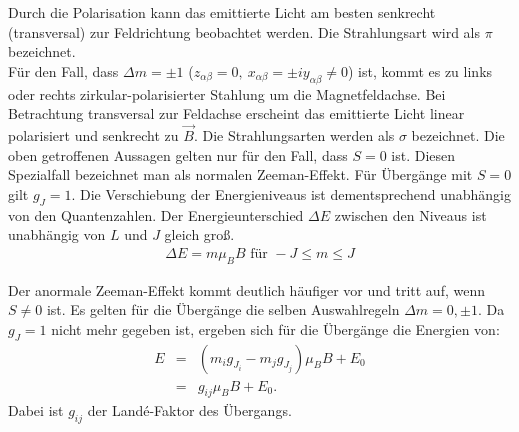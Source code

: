Durch die Polarisation kann das emittierte Licht am besten senkrecht (transversal) zur Feldrichtung beobachtet werden.
Die Strahlungsart wird als $\pi$ bezeichnet.\\
%
Für den Fall, dass $\Delta m = \pm 1$ ($z_{\alpha\beta} = 0,\ x_{\alpha\beta} = \pm i y_{\alpha\beta} \neq 0$) ist, kommt es zu links oder rechts zirkular-polarisierter Stahlung um die Magnetfeldachse.
Bei Betrachtung transversal zur Feldachse erscheint das emittierte Licht linear polarisiert und senkrecht zu $\vec{B}$.
Die Strahlungsarten werden als $\sigma$ bezeichnet.
%
Die oben getroffenen Aussagen gelten nur für den Fall, dass $S=0$ ist.
Diesen Spezialfall bezeichnet man als normalen Zeeman-Effekt.
Für Übergänge mit $S=0$ gilt $g_J = 1$.
Die Verschiebung der Energieniveaus ist dementsprechend unabhängig von den Quantenzahlen.
Der Energieunterschied $\Delta E$ zwischen den Niveaus ist unabhängig von $L$ und $J$ gleich groß.
\begin{align}
  \Delta E = m \mu_B B \text{ für } -J \leq m \leq J
  \label{eqn:normal}
\end{align}

Der anormale Zeeman-Effekt kommt deutlich häufiger vor und tritt auf, wenn $S \neq 0$ ist.
Es gelten für die Übergänge die selben Auswahlregeln $\Delta m = 0, \pm 1$.
Da $g_J = 1$ nicht mehr gegeben ist, ergeben sich für die Übergänge die Energien von:
\begin{align}
	E &=& (m_ig_{J_i}-m_jg_{J_j})\mu_BB+E_0
  \label{eqn:anormal}\\
    &=& g_{ij}\mu_BB + E_0.
    \label{eqn:allgemein}
\end{align}
Dabei ist $g_{ij}$ der Landé-Faktor des Übergangs.
\FloatBarrier

